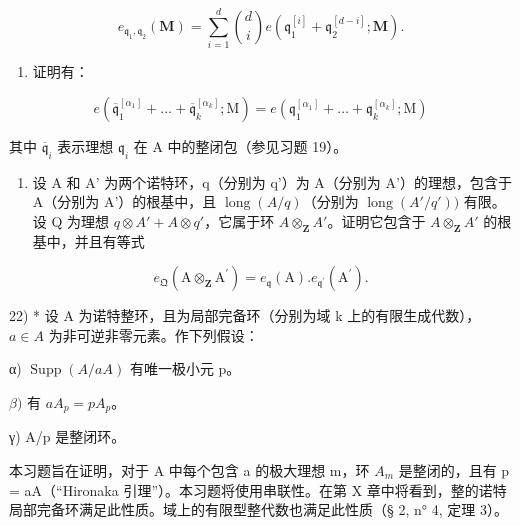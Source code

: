 \[
e _ {\mathfrak {q} _ {1}, \mathfrak {q} _ {2}} (\mathbf {M}) = \sum_ {i = 1} ^ {d} \binom {d} {i} e (\mathfrak {q} _ {1} ^ {[ i ]} + \mathfrak {q} _ {2} ^ {[ d - i ]}; \mathbf {M}).
\]

\begin{enumerate}
\def\labelenumi{\alph{enumi})}
\setcounter{enumi}{5}
\tightlist
\item
  证明有：
\end{enumerate}

\[
e \left(\overline {{{\mathfrak {q}}}} _ {1} ^ {[ \alpha_ {1} ]} + \dots + \overline {{{\mathfrak {q}}}} _ {k} ^ {[ \alpha_ {k} ]}; \mathrm{M}\right) = e \left(\mathfrak {q} _ {1} ^ {[ \alpha_ {1} ]} + \dots + \mathfrak {q} _ {k} ^ {[ \alpha_ {k} ]}; \mathrm{M}\right)
\]

其中 \(\overline{\mathfrak{q}}_{i}\) 表示理想 \(\mathfrak{q}_{i}\) 在 A 中的整闭包（参见习题 19）。

\begin{enumerate}
\def\labelenumi{\arabic{enumi})}
\setcounter{enumi}{20}
\tightlist
\item
  设 A 和 A' 为两个诺特环，q（分别为 q'）为 A（分别为 A'）的理想，包含于 A（分别为 A'）的根基中，且 \(\operatorname{long}(A/q)\)（分别为 \(\operatorname{long}(A'/q'))\) 有限。设 Q 为理想 \(q \otimes A' + A \otimes q'\)，它属于环 \(A \otimes_{\mathbf{Z}} A'\)。证明它包含于 \(A \otimes_{\mathbf{Z}} A'\) 的根基中，并且有等式
\end{enumerate}

\[
e _ {\mathfrak {Q}} (\mathrm{A} \otimes_ {\mathbf {Z}} \mathrm{A} ^ {\prime}) = e _ {\mathfrak {q}} (\mathrm{A}). e _ {\mathfrak {q} ^ {\prime}} (\mathrm{A} ^ {\prime}).
\]

22) * 设 A 为诺特整环，且为局部完备环（分别为域 k 上的有限生成代数），\(a \in A\) 为非可逆非零元素。作下列假设：

α) \(\operatorname{Supp}(A/aA)\) 有唯一极小元 p。

\(\beta)\) 有 \(aA_{p} = pA_{p}\)。

γ) A/p 是整闭环。

本习题旨在证明，对于 A 中每个包含 a 的极大理想 m，环 \(A_{m}\) 是整闭的，且有 p = aA（“Hironaka 引理”）。本习题将使用串联性。在第 X 章中将看到，整的诺特局部完备环满足此性质。域上的有限型整代数也满足此性质（§ 2, n° 4, 定理 3）。


